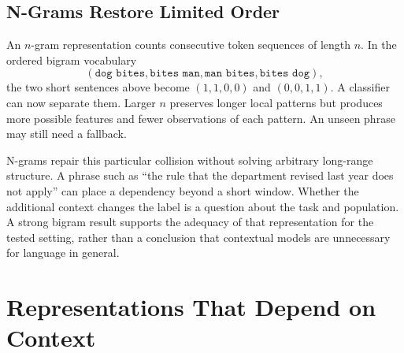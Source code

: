 \par\addvspace{\intextsep}\noindent\begin{minipage}{\linewidth}
\centering
{}
\label{fig:syntax-tree-visual}
\end{minipage}\par\addvspace{\intextsep}

\subsection{N-Grams Restore Limited Order}

An $n$-gram representation counts consecutive token sequences of length $n$. In the ordered bigram vocabulary
\[
 (\texttt{dog bites},\texttt{bites man},\texttt{man bites},\texttt{bites dog}),
\]
the two short sentences above become $(1,1,0,0)$ and $(0,0,1,1)$. A classifier can now separate them. Larger $n$ preserves longer local patterns but produces more possible features and fewer observations of each pattern. An unseen phrase may still need a fallback.

N-grams repair this particular collision without solving arbitrary long-range structure. A phrase such as ``the rule that the department revised last year does not apply'' can place a dependency beyond a short window. Whether the additional context changes the label is a question about the task and population. A strong bigram result supports the adequacy of that representation for the tested setting, rather than a conclusion that contextual models are unnecessary for language in general.

\section{Representations That Depend on Context}


